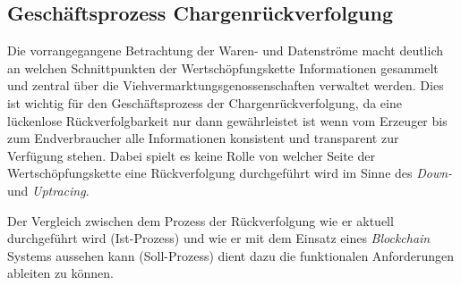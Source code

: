 
\subsection{Geschäftsprozess Chargenrückverfolgung}
Die vorrangegangene Betrachtung der Waren- und Datenströme macht deutlich an welchen Schnittpunkten der Wertschöpfungskette Informationen gesammelt und zentral über die Viehvermarktungsgenossenschaften verwaltet werden. Dies ist wichtig für den Geschäftsprozess der Chargenrückverfolgung, da eine lückenlose Rückverfolgbarkeit nur dann gewährleistet ist wenn vom Erzeuger bis zum Endverbraucher alle Informationen konsistent und transparent zur Verfügung stehen. Dabei spielt es keine Rolle von welcher Seite der Wertschöpfungskette eine Rückverfolgung durchgeführt wird im Sinne des \textit{Down-} und \textit{Uptracing}.

Der Vergleich zwischen dem Prozess der Rückverfolgung wie er aktuell durchgeführt wird (Ist-Prozess) und wie er mit dem Einsatz eines \textit{Blockchain} Systems aussehen kann (Soll-Prozess) dient dazu die funktionalen Anforderungen ableiten zu können.


